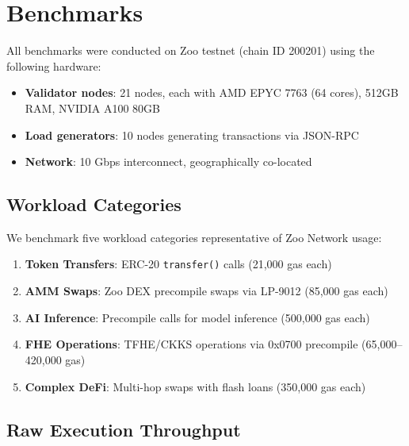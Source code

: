 \section{Benchmarks}

\label{sec:benchmarks}

All benchmarks were conducted on Zoo testnet (chain ID 200201) using the following hardware:

\begin{itemize}
    \item \textbf{Validator nodes}: 21 nodes, each with AMD EPYC 7763 (64 cores), 512GB RAM, NVIDIA A100 80GB
    \item \textbf{Load generators}: 10 nodes generating transactions via JSON-RPC
    \item \textbf{Network}: 10 Gbps interconnect, geographically co-located
\end{itemize}

\subsection{Workload Categories}

We benchmark five workload categories representative of Zoo Network usage:

\begin{enumerate}
    \item \textbf{Token Transfers}: ERC-20 \texttt{transfer()} calls (21,000 gas each)
    \item \textbf{AMM Swaps}: Zoo DEX precompile swaps via LP-9012 (85,000 gas each)
    \item \textbf{AI Inference}: Precompile calls for model inference (500,000 gas each)
    \item \textbf{FHE Operations}: TFHE/CKKS operations via 0x0700 precompile (65,000--420,000 gas)
    \item \textbf{Complex DeFi}: Multi-hop swaps with flash loans (350,000 gas each)
\end{enumerate}

\subsection{Raw Execution Throughput}

